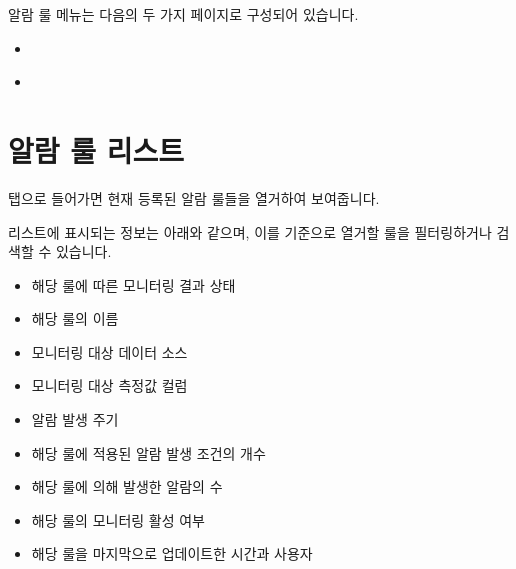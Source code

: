 \documentclass[letterpaper,10pt,english]{sphinxmanual}
\begin{document}
알람 룰 메뉴는 다음의 두 가지 페이지로 구성되어 있습니다.
\begin{itemize}
\item {} 
{\hyperref[\detokenize{anomaly/part04/index:alarm-rule-list}]{}}

\item {} 
{\hyperref[\detokenize{anomaly/part04/index:alarm-rule-details}]{}}

\end{itemize}


\section{알람 룰 리스트}
\label{\detokenize{anomaly/part04/index:alarm-rule-list}}\label{\detokenize{anomaly/part04/index:id2}}
 탭으로 들어가면 현재 등록된 알람 룰들을 열거하여 보여줍니다.
\begin{quote}

\begin{figure}[H]
\centering

\noindent{}
\end{figure}
\end{quote}

리스트에 표시되는 정보는 아래와 같으며, 이를 기준으로 열거할 룰을 필터링하거나 검색할 수 있습니다.
\begin{itemize}
\item {} 
 해당 룰에 따른 모니터링 결과 상태

\item {} 
 해당 룰의 이름

\item {} 
 모니터링 대상 데이터 소스

\item {} 
 모니터링 대상 측정값 컬럼

\item {} 
 알람 발생 주기

\item {} 
 해당 룰에 적용된 알람 발생 조건의 개수

\item {} 
 해당 룰에 의해 발생한 알람의 수

\item {} 
 해당 룰의 모니터링 활성 여부

\item {} 
 해당 룰을 마지막으로 업데이트한 시간과 사용자

\end{itemize}
\end{document}
